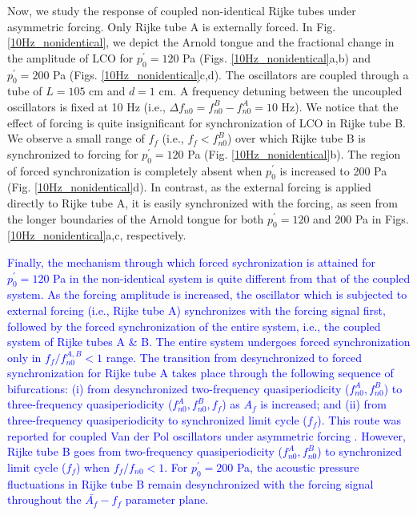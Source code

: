 \documentclass[%
preprint,
 amsmath,amssymb,
 aps,
 pra,
]{revtex4-2}
\begin{document}
Now, we study the response of coupled non-identical Rijke tubes under asymmetric forcing. Only Rijke tube A is externally forced. In Fig. \ref{10Hz_nonidentical}, we depict the Arnold tongue and the fractional change in the amplitude of LCO for $p^\prime_{0}=120$ Pa (Figs. \ref{10Hz_nonidentical}a,b) and $p^\prime_{0}=200$ Pa (Figs. \ref{10Hz_nonidentical}c,d). The oscillators are coupled through a tube of $L=105$ cm and $d=1$ cm. A frequency detuning between the uncoupled oscillators is fixed at 10 Hz (i.e., $\Delta f_{n0} = f^B_{n0}-f^A_{n0}=10$ Hz). We notice that the effect of forcing is quite insignificant for synchronization of LCO in Rijke tube B. We observe a small range of $f_f$ (i.e., $f_f<f^B_{n0}$) over which Rijke tube B is synchronized to forcing for $p^\prime_{0} = 120$ Pa (Fig. \ref{10Hz_nonidentical}b). The region of forced synchronization is completely absent when $p^\prime_0$ is increased to 200 Pa (Fig. \ref{10Hz_nonidentical}d). In contrast, as the external forcing is applied directly to Rijke tube A, it is easily synchronized with the forcing, as seen from the longer boundaries of the Arnold tongue for both $p^\prime_{0} = 120$ and 200 Pa in Figs. \ref{10Hz_nonidentical}a,c, respectively. 

\textcolor{blue}{Finally, the mechanism through which forced sychronization is attained for $p^\prime_{0} = 120$ Pa in the non-identical system is quite different from that of the coupled system. As the forcing amplitude is increased, the oscillator which is subjected to external forcing (i.e., Rijke tube A) synchronizes with the forcing signal first, followed by the forced synchronization of the entire system, i.e., the coupled system of Rijke tubes A \& B. The entire system undergoes forced synchronization only in $f_f/f_{n0}^{A,B}< 1$ range. The transition from desynchronized to forced synchronization for Rijke tube A takes place through the following sequence of bifurcations: (i) from desynchronized two-frequency quasiperiodicity ($f_{n0}^A,f_{n0}^B$) to three-frequency quasiperiodicity ($f_{n0}^A,f_{n0}^B,f_f$) as $A_f$ is increased; and (ii) from three-frequency quasiperiodicity to synchronized limit cycle ($f_f$). This route was reported for coupled Van der Pol oscillators under asymmetric forcing \cite{anishchenko2008bifurcational,anishchenko2009phase}. However, Rijke tube B goes from two-frequency quasiperiodicity ($f_{n0}^A,f_{n0}^B$) to synchronized limit cycle ($f_f$) when $f_f/f_{n0}<1$. For $p^\prime_{0} = 200$ Pa, the acoustic pressure fluctuations in Rijke tube B remain desynchronized with the forcing signal throughout the $\bar{A_f}-f_f$ parameter plane.}
\end{document}
